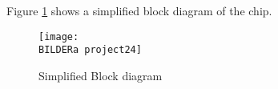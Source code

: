 
Figure \ref{fig:asTop02} shows a simplified block diagram of the chip.
\begin{figure}[H] 
\centering
  \texttt{[image: \\BILDERa project24]}
\caption{Simplified Block diagram}
\label{fig:asTop02}
\end{figure}
